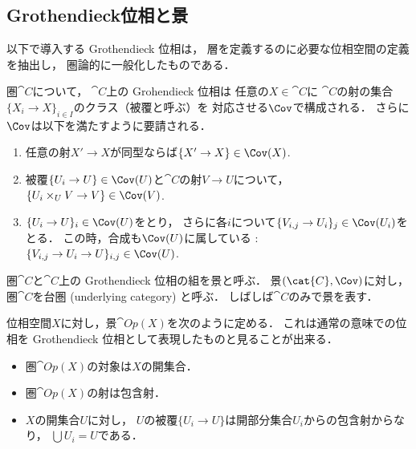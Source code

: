     \subsection{Grothendieck位相と景}
    以下で導入する Grothendieck 位相は，
    層を定義するのに必要な位相空間の定義を抽出し，
    圏論的に一般化したものである．

    \begin{Def}
        圏$\cat{C}$について，
        $\cat{C}$上の Grohendieck 位相は
        任意の$X \in \cat{C}$に
        $\cat{C}$の射の集合$\{X_i \to X\}_{i \in I}$のクラス（被覆と呼ぶ）を
        対応させる$\Cov$で構成される．
        さらに$\Cov$は以下を満たすように要請される．
        \begin{enumerate}[label=(\alph*)]
            \item
                任意の射$X' \to X$が同型ならば$\{X' \to X\} \in \Cov(X)$.
            \item
                被覆$\{U_i \to U\} \in \Cov(U)$と$\cat{C}$の射$V \to U$について，
                $\{U_i \times_U V \to V\} \in \Cov(V)$.
            \item
                $\{U_i \to U\}_i \in \Cov(U)$をとり，
                さらに各$i$について$\{V_{i,j} \to U_i\}_j \in \Cov(U_i)$をとる．
                この時，合成も$\Cov(U)$に属している : $\{V_{i,j} \to U_i \to U\}_{i,j} \in \Cov(U)$.
        \end{enumerate}
    \end{Def}

    \begin{Def}[景]
        圏$\cat{C}$と$\cat{C}$上の Grothendieck 位相の組を景と呼ぶ．
        景$(\cat{C}, \Cov)$に対し，圏$\cat{C}$を台圏 (underlying category) と呼ぶ．
        しばしば$\cat{C}$のみで景を表す．
    \end{Def}

    \begin{Example}
        位相空間$X$に対し，景$\cat{Op}(X)$を次のように定める．
        これは通常の意味での位相を Grothendieck 位相として表現したものと見ることが出来る．
        \begin{itemize}
            \item 圏$\cat{Op}(X)$の対象は$X$の開集合．
            \item 圏$\cat{Op}(X)$の射は包含射．
            \item
                $X$の開集合$U$に対し，
                $U$の被覆$\{U_i \to U \}$は開部分集合$U_i$からの包含射からなり，
                $\bigcup U_i=U$である．
        \end{itemize}
    \end{Example}

